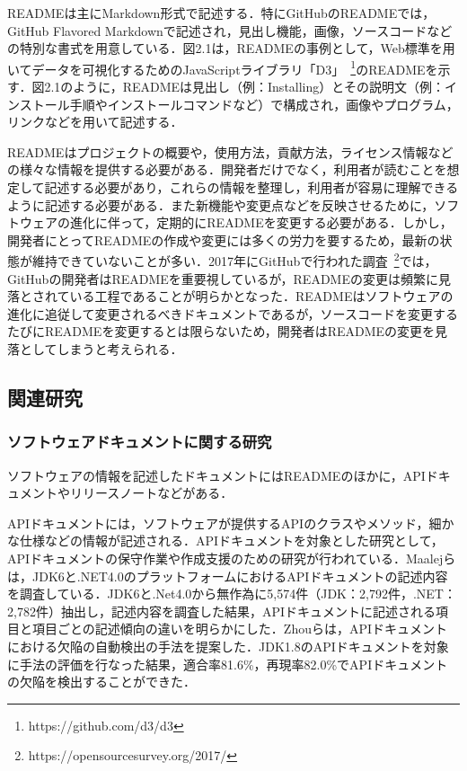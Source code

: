 \documentclass[submit]{ipsj}
\begin{document}
READMEは主にMarkdown形式で記述する．特にGitHubのREADMEでは，GitHub Flavored Markdownで記述され，見出し機能，画像，ソースコードなどの特別な書式を用意している．図2.1は，READMEの事例として，Web標準を用いてデータを可視化するためのJavaScriptライブラリ「D3」~\footnote[4]{https://github.com/d3/d3}のREADMEを示す．図2.1のように，READMEは見出し（例：Installing）とその説明文（例：インストール手順やインストールコマンドなど）で構成され，画像やプログラム，リンクなどを用いて記述する．


READMEはプロジェクトの概要や，使用方法，貢献方法，ライセンス情報などの様々な情報を提供する必要がある．開発者だけでなく，利用者が読むことを想定して記述する必要があり，これらの情報を整理し，利用者が容易に理解できるように記述する必要がある．また新機能や変更点などを反映させるために，ソフトウェアの進化に伴って，定期的にREADMEを変更する必要がある．しかし，開発者にとってREADMEの作成や変更には多くの労力を要するため，最新の状態が維持できていないことが多い．2017年にGitHubで行われた調査~\footnote[3]{https://opensourcesurvey.org/2017/}では，GitHubの開発者はREADMEを重要視しているが，READMEの変更は頻繁に見落とされている工程であることが明らかとなった．READMEはソフトウェアの進化に追従して変更されるべきドキュメントであるが，ソースコードを変更するたびにREADMEを変更するとは限らないため，開発者はREADMEの変更を見落としてしまうと考えられる．






\subsection{関連研究}
\subsubsection{ソフトウェアドキュメントに関する研究}
ソフトウェアの情報を記述したドキュメントにはREADMEのほかに，APIドキュメントやリリースノートなどがある．

APIドキュメントには，ソフトウェアが提供するAPIのクラスやメソッド，細かな仕様などの情報が記述される．APIドキュメントを対象とした研究として，APIドキュメントの保守作業や作成支援のための研究が行われている．Maalejらは，JDK6と.NET4.0のプラットフォームにおけるAPIドキュメントの記述内容を調査している\cite{Ikeda_9_Maalej_API}．JDK6と.Net4.0から無作為に5,574件（JDK：2,792件，.NET：2,782件）抽出し，記述内容を調査した結果，APIドキュメントに記述される項目と項目ごとの記述傾向の違いを明らかにした．Zhouらは，APIドキュメントにおける欠陥の自動検出の手法を提案した\cite{APIDoc_Detection}．JDK1.8のAPIドキュメントを対象に手法の評価を行なった結果，適合率81.6\%，再現率82.0\%でAPIドキュメントの欠陥を検出することができた．
\end{document}
